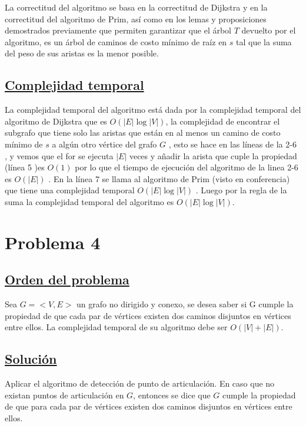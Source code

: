 \documentclass{article}
\begin{document}
    \noindent La correctitud del algoritmo se basa en la correctitud  de Dijkstra  
    y en la correctitud del algoritmo de Prim, as\'i como en los lemas y proposiciones demostrados previamente 
    que permiten garantizar  que el \'arbol $T$ devuelto por el algoritmo, es un \'arbol de caminos de costo
    m\'inimo de ra\'iz en $s$ tal que la suma del peso de sus aristas es la menor posible.
    

    \subsection{\underline{Complejidad temporal}}

    \noindent La complejidad temporal del algoritmo est\'a dada por  la complejidad temporal del algoritmo de Dijkstra 
    que es $O(|E|\log |V|)$, la complejidad de encontrar el subgrafo que tiene solo las aristas que est\'an en al menos 
    un camino de costo m\'inimo de $s$ a alg\'un otro v\'ertice del grafo $G$ , esto se hace en las l\'ineas de la 2-6 , y vemos que el for se 
    ejecuta $|E|$ veces  y a\~nadir la arista que cuple la propiedad (l\'inea 5 )es $O(1)$ por lo que el tiempo de ejecuci\'on del algoritmo 
    de la linea 2-6 es $O(|E|)$ . En la l\'inea 7 se llama al algoritmo de Prim (visto en conferencia) que tiene una complejidad temporal
    $O(|E|\log |V|)$ . Luego por la regla de la suma la complejidad temporal del algoritmo es  $O(|E|\log |V|)$.

    \newpage


    \section{Problema 4} 

    \subsection{\underline{Orden del problema}} 
    Sea $G = <V, E>$ un grafo no dirigido y conexo, se desea saber si G cumple la propiedad de que cada par de
    v\'ertices existen dos caminos disjuntos en v\'ertices entre ellos. La complejidad temporal de su algoritmo debe
    ser $O(|V| + |E|)$.
    \newline
    \newline
    \subsection{\underline{Soluci\'on}} 
    Aplicar el algoritmo de detecci\'on de punto de articulaci\'on. En caso que no  existan puntos de articulaci\'on
    en $G$, entonces se dice que $G$ cumple la propiedad de que para cada par de v\'ertices  existen dos caminos disjuntos
    en v\'ertices entre ellos.\\ 
\end{document}
